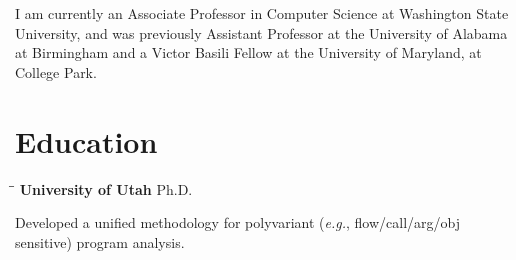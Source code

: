 \documentclass[line]{res}
\begin{document}

\address{\bf gilray.org
\ \ \ \ \ \ \ \ }
                                  
\begin{resume}        

\vspace{-0.1in}  
I am currently an Associate Professor in Computer Science at Washington State University, and was previously Assistant Professor at the University of Alabama at Birmingham and a Victor Basili Fellow at the University of Maryland, at College Park.


\section{\large Education}          
    \vspace{-0.1cm}	
    \begin{tabbing}
    \hspace{2.25in}\= \hspace{2.25in}\= \kill %
    {\bf University of Utah} \>Ph.D.     
    \end{tabbing}\vspace{-0.5cm}
    Developed a unified methodology for polyvariant (\textit{e.g.}, flow/call/arg/obj sensitive) program analysis.%
    

\end{resume}
\end{document}
